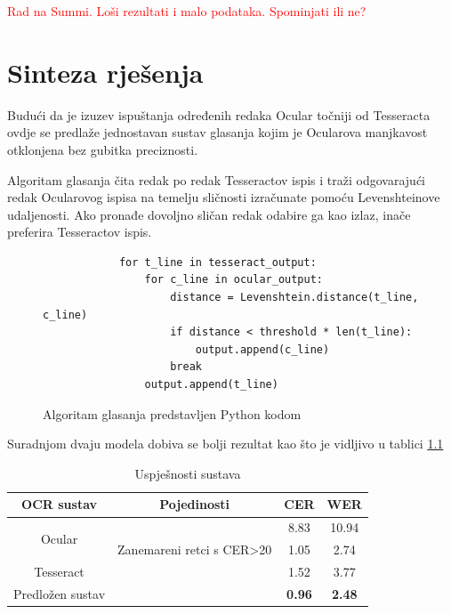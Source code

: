 \documentclass[zavrsnirad]{fer}
\begin{document}
\textcolor{red}{Rad na Summi. Loši rezultati i malo podataka. Spominjati ili ne?}

\chapter{Sinteza rješenja}
\label{pog:sinteza_rješenja}

Budući da je izuzev ispuštanja određenih redaka Ocular točniji od Tesseracta ovdje se predlaže jednostavan sustav glasanja kojim je Ocularova manjkavost otklonjena bez gubitka preciznosti.

Algoritam glasanja čita redak po redak Tesseractov ispis i traži odgovarajući redak Ocularovog ispisa na temelju sličnosti izračunate pomoću Levenshteinove udaljenosti. Ako pronađe dovoljno sličan redak odabire ga kao izlaz, inače preferira Tesseractov ispis.

\begin{figure}[h]
	\centering
	\begin{adjustwidth}{1cm}{1cm}
		\begin{lstlisting}
			for t_line in tesseract_output:
				for c_line in ocular_output:
					distance = Levenshtein.distance(t_line, c_line)
					if distance < threshold * len(t_line):
						output.append(c_line)
					break
				output.append(t_line)
		\end{lstlisting}
	\end{adjustwidth}
	\caption{Algoritam glasanja predstavljen Python kodom}
	\label{fig:python_code}
\end{figure}

Suradnjom dvaju modela dobiva se bolji rezultat kao što je vidljivo u tablici \ref{tab:system_performance}

\bgroup
\def\arraystretch{1.25}
\begin{table}[h]
	\centering
	\begin{tabular}{|c|c|c|c|}
		\hline
		\textbf{OCR sustav} & \textbf{Pojedinosti} & \textbf{CER} & \textbf{WER} \\ \hline
		\multirow{2}{*}{Ocular} & & 8.83 & 10.94 \\ \cline{2-4}
								& Zanemareni retci s CER>20 & 1.05 & 2.74 \\ \hline
		Tesseract & & 1.52 & 3.77 \\ \hline
		Predložen sustav & & \textbf{0.96} & \textbf{2.48} \\ \hline
	\end{tabular}
	\caption{Uspješnosti sustava}
	\label{tab:system_performance}
\end{table}
\egroup
\end{document}
